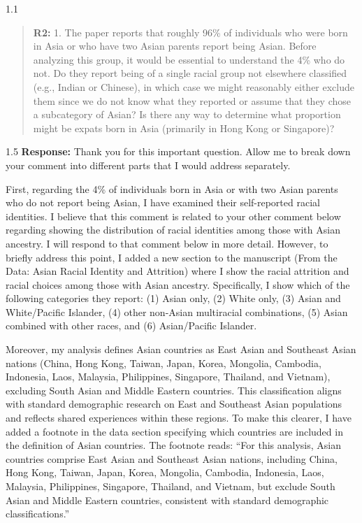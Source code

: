 \documentclass[12pt,english]{article}
\newcommand{\rrquote}{1.1}
\newcommand{\rrxspc}{1.5}
\begin{document}
\begin{refsection}
    \begin{spacing}{\rrquote}
        \begin{quotation}
        \textbf{R2: } 1. The paper reports that roughly 96\% of individuals who were born in Asia or who have two Asian parents report being Asian. Before analyzing this group, it would be essential to understand the 4\% who do not. Do they report being of a single racial group not elsewhere classified (e.g., Indian or Chinese), in which case we might reasonably either exclude them since we do not know what they reported or assume that they chose a subcategory of Asian? Is there any way to determine what proportion might be expats born in Asia (primarily in Hong Kong or Singapore)?
        \end{quotation}
        \end{spacing}
        
        \begin{spacing}{\rrxspc}
            \textbf{Response:}  Thank you for this important question. Allow me to break down your comment into different parts that I would address separately. 

            First, regarding the 4\% of individuals born in Asia or with two Asian parents who do not report being Asian, I have examined their self-reported racial identities. I believe that this comment is related to your other comment below regarding showing the distribution of racial identities among those with Asian ancestry. I will respond to that comment below in more detail. However, to briefly address this point, I added a new section to the manuscript (From the Data: Asian Racial Identity and Attrition) where I show the racial attrition and racial choices among those with Asian ancestry. Specifically, I show which of the following categories they report: (1) Asian only, (2) White only, (3) Asian and White/Pacific Islander, (4) other non-Asian multiracial combinations, (5) Asian combined with other races, and (6) Asian/Pacific Islander. 

            Moreover, my analysis defines Asian countries as East Asian and Southeast Asian nations (China, Hong Kong, Taiwan, Japan, Korea, Mongolia, Cambodia, Indonesia, Laos, Malaysia, Philippines, Singapore, Thailand, and Vietnam), excluding South Asian and Middle Eastern countries. This classification aligns with standard demographic research on East and Southeast Asian populations and reflects shared experiences within these regions. To make this clearer, I have added a footnote in the data section specifying which countries are included in the definition of Asian countries. The footnote reads: ``For this analysis, Asian countries comprise East Asian and Southeast Asian nations, including China, Hong Kong, Taiwan, Japan, Korea, Mongolia, Cambodia, Indonesia, Laos, Malaysia, Philippines, Singapore, Thailand, and Vietnam, but exclude South Asian and Middle Eastern countries, consistent with standard demographic classifications.''



\end{spacing}
\end{refsection}
\end{document}
